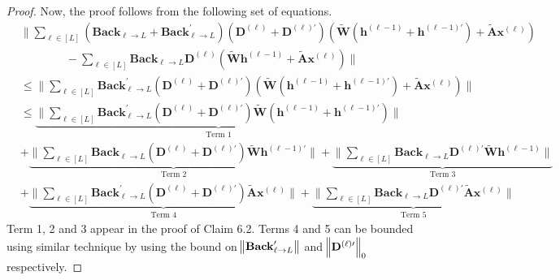 \begin{proof}
	Now, the proof follows from the following set of equations.
	\begin{align*}
		&\| \sum_{\ell \in [L]}\left(\mathbf{Back}_{\ell \rightarrow L}+\mathbf{Back}_{\ell \rightarrow L}^{\prime}\right)\left(\mathbf{D}^{(\ell)}+\mathbf{D}^{(\ell)\prime}\right) \left(\widetilde{\mathbf{W}}\left(\mathbf{h}^{(\ell-1)}+\mathbf{h}^{(\ell-1)\prime}\right) + \widetilde{\mathbf{A}} \mathbf{x}^{(\ell)} \right) \\
		&\quad\quad\quad\quad -\sum_{\ell \in [L]} \mathbf{Back}_{\ell \rightarrow L}  \mathbf{D}^{(\ell)} \left(\widetilde{\mathbf{W}} \mathbf{h}^{(\ell-1)} + \widetilde{\mathbf{A}} \mathbf{x}^{(\ell)} \right) \| \\&
		\le \| \sum_{\ell \in [L]}\mathbf{Back}_{\ell \rightarrow L}^{\prime} \left(\mathbf{D}^{(\ell)}+\mathbf{D}^{(\ell)\prime}\right) \left(\widetilde{\mathbf{W}}\left(\mathbf{h}^{(\ell-1)}+\mathbf{h}^{(\ell-1)\prime}\right) + \widetilde{\mathbf{A}} \mathbf{x}^{(\ell)} \right) \| \\&
		\le \underbrace{\|\sum_{\ell \in [L]} \mathbf{Back}_{\ell \rightarrow L}^{\prime} \left(\mathbf{D}^{(\ell)}+\mathbf{D}^{(\ell)\prime}\right) \widetilde{\mathbf{W}} \left(\mathbf{h}^{(\ell-1)}+\mathbf{h}^{(\ell-1)\prime}\right)\|}_{\text{Term 1}} \\& + \underbrace{ \|\sum_{\ell \in [L]} \mathbf{Back}_{\ell \rightarrow L} \left(\mathbf{D}^{(\ell)}+\mathbf{D}^{(\ell)\prime}\right) \widetilde{\mathbf{W}} \mathbf{h}^{(\ell-1)\prime}\|}_{\text{Term 2}}  + 
		\underbrace{\|\sum_{\ell \in [L]} \mathbf{Back}_{\ell \rightarrow L} \mathbf{D}^{(\ell)\prime} \widetilde{\mathbf{W}} \mathbf{h}^{(\ell-1)}\|}_{\text{Term 3}} \\&
		+ \underbrace{\|\sum_{\ell \in [L]} \mathbf{Back}_{\ell \rightarrow L}^{\prime} \left(\mathbf{D}^{(\ell)} +\mathbf{D}^{(\ell)\prime}\right) \widetilde{\mathbf{A}} \mathbf{x}^{(\ell)}\|}_{\text{Term 4}} + \underbrace{\|\sum_{\ell \in [L]} \mathbf{Back}_{\ell \rightarrow L} \mathbf{D}^{(\ell)\prime} \widetilde{\mathbf{A}} \mathbf{x}^{(\ell)}\|}_{\text{Term 5}} 
	\end{align*}
	Term 1, 2 and 3 appear in the proof of Claim 6.2\cite{allen2019can}. Terms 4 and 5 can be bounded using similar technique by using the bound on $\norm{\mathbf{Back}^{\prime}_{\ell \to L}}$ and $\norm{\mathbf{D}^{(\ell)\prime}}_0$ respectively.
\end{proof}





